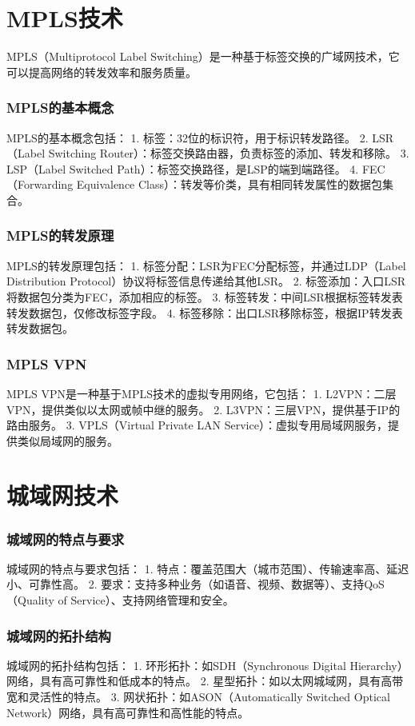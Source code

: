 \documentclass{book}
\begin{document}
\section{MPLS技术}
MPLS（Multiprotocol Label Switching）是一种基于标签交换的广域网技术，它可以提高网络的转发效率和服务质量。
\subsubsection{MPLS的基本概念}
MPLS的基本概念包括：
1. 标签：32位的标识符，用于标识转发路径。
2. LSR（Label Switching Router）：标签交换路由器，负责标签的添加、转发和移除。
3. LSP（Label Switched Path）：标签交换路径，是LSP的端到端路径。
4. FEC（Forwarding Equivalence Class）：转发等价类，具有相同转发属性的数据包集合。
\subsubsection{MPLS的转发原理}
MPLS的转发原理包括：
1. 标签分配：LSR为FEC分配标签，并通过LDP（Label Distribution Protocol）协议将标签信息传递给其他LSR。
2. 标签添加：入口LSR将数据包分类为FEC，添加相应的标签。
3. 标签转发：中间LSR根据标签转发表转发数据包，仅修改标签字段。
4. 标签移除：出口LSR移除标签，根据IP转发表转发数据包。
\subsubsection{MPLS VPN}
MPLS VPN是一种基于MPLS技术的虚拟专用网络，它包括：
1. L2VPN：二层VPN，提供类似以太网或帧中继的服务。
2. L3VPN：三层VPN，提供基于IP的路由服务。
3. VPLS（Virtual Private LAN Service）：虚拟专用局域网服务，提供类似局域网的服务。
\section{城域网技术}
\subsubsection{城域网的特点与要求}
城域网的特点与要求包括：
1. 特点：覆盖范围大（城市范围）、传输速率高、延迟小、可靠性高。
2. 要求：支持多种业务（如语音、视频、数据等）、支持QoS（Quality of Service）、支持网络管理和安全。
\subsubsection{城域网的拓扑结构}
城域网的拓扑结构包括：
1. 环形拓扑：如SDH（Synchronous Digital Hierarchy）网络，具有高可靠性和低成本的特点。
2. 星型拓扑：如以太网城域网，具有高带宽和灵活性的特点。
3. 网状拓扑：如ASON（Automatically Switched Optical Network）网络，具有高可靠性和高性能的特点。
\end{document}
